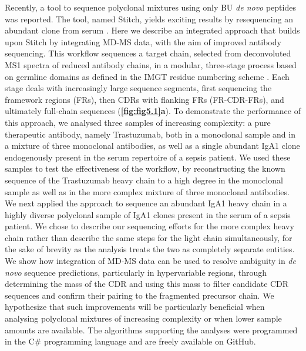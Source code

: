 Recently, a tool to sequence polyclonal mixtures using only BU \emph{de novo} peptides was reported. The tool, named Stitch, yields exciting results by resequencing an abundant clone from serum \cite{schulte2022template-based}. Here we describe an integrated approach that builds upon Stitch by integrating MD-MS data, with the aim of improved antibody sequencing. This workflow sequences a target chain, selected from deconvoluted MS1 spectra of reduced antibody chains, in a modular, three-stage process based on germline domains as defined in the IMGT residue numbering scheme \cite{lefranc1997unique}. Each stage deals with increasingly large sequence segments, first sequencing the framework regions (FRs), then CDRs with flanking FRs (FR-CDR-FRs), and ultimately full-chain sequences (\textbf{\autoref{fig:fig5.1}a}). To demonstrate the performance of this approach, we analysed three samples of increasing complexity: a pure therapeutic antibody, namely Trastuzumab, both in a monoclonal sample and in a mixture of three monoclonal antibodies, as well as a single abundant IgA1 clone endogenously present in the serum repertoire of a sepsis patient. We used these samples to test the effectiveness of the workflow, by reconstructing the known sequence of the Trastuzumab heavy chain to a high degree in the monoclonal sample as well as in the more complex mixture of three monoclonal antibodies. We next applied the approach to sequence an abundant IgA1 heavy chain in a highly diverse polyclonal sample of IgA1 clones present in the serum of a sepsis patient. We chose to describe our sequencing efforts for the more complex heavy chain rather than describe the same steps for the light chain simultaneously, for the sake of brevity as the analysis treats the two as completely separate entities. We show how integration of MD-MS data can be used to resolve ambiguity in \emph{de novo} sequence predictions, particularly in hypervariable regions, through determining the mass of the CDR and using this mass to filter candidate CDR sequences and confirm their pairing to the fragmented precursor chain. We hypothesize that such improvements will be particularly beneficial when analysing polyclonal mixtures of increasing complexity or when lower sample amounts are available. The algorithms supporting the analyses were programmed in the C\# programming language and are freely available on GitHub.

